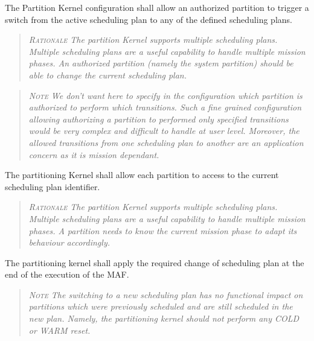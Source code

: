 The Partition Kernel configuration shall allow an authorized partition to trigger a switch from the active scheduling plan to any of the defined scheduling plans.
\begin{quote}\it
\textsc{Rationale}
The partition Kernel supports multiple scheduling plans. Multiple scheduling plans are a useful capability to handle multiple mission phases. An authorized partition (namely the system partition) should be able to change the current scheduling plan.
\end{quote}
\begin{quote}\it
\textsc{Note}
We don't want here to specify in the configuration which partition is authorized to perform which transitions. Such a fine grained configuration allowing authorizing a partition to performed only specified transitions would be very complex and difficult to handle at user level. Moreover, the allowed transitions from one scheduling plan to another are an application concern as it is mission dependant.
\end{quote}

The partitioning Kernel shall allow each partition to access to the current scheduling plan identifier.
\begin{quote}\it
\textsc{Rationale}
The partition Kernel supports multiple scheduling plans. Multiple scheduling plans are a useful capability to handle multiple mission phases. A partition needs to know the current mission phase to adapt its behaviour accordingly.
\end{quote}

The partitioning kernel shall apply the required change of scheduling plan at the end of the execution of the MAF.
\begin{quote}\it
\textsc{Note}
The switching to a new scheduling plan has no functional impact on partitions which were previously scheduled and are still scheduled in the new plan. Namely, the partitioning kernel should not perform any COLD or WARM reset.
\end{quote}

